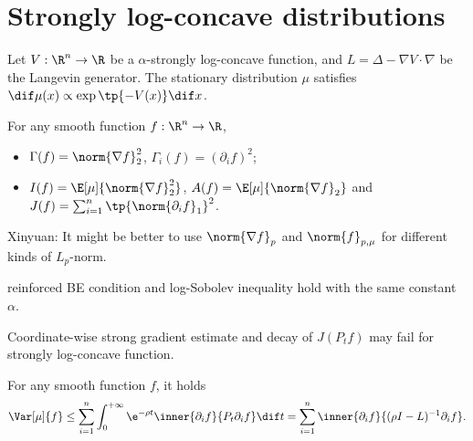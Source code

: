 \section{Strongly log-concave distributions}

Let $V:\R^n \to \R$ be a $\alpha$-strongly log-concave function, and $L = \Delta - \nabla V \cdot \nabla$ be the Langevin generator. The stationary distribution $\mu$ satisfies $\dif \mu(x) \propto \exp\tp{-V(x)} \dif x$.

\begin{definition}
    For any smooth function $f : \R^n \to \R$,
    \begin{itemize}
    \item $\Gamma(f) = \norm{\nabla f}_2^2$, $\Gamma_i(f) = (\partial_i f)^2$;
    \item $I(f) = \E[\mu]{\norm{\nabla f}_2^2}$, $A(f) = \E[\mu]{\norm{\nabla f}_2}$ and $J(f) = \sum_{i=1}^n \tp{\norm{\partial_i f}_1}^2$.
    \end{itemize}
\end{definition}

{\color{blue}
Xinyuan: It might be better to use $\norm{\nabla f}_p$ and $\norm{f}_{p,\mu}$ for different kinds of $L_p$-norm.
}


\begin{proposition}[folklore]
    reinforced BE condition and log-Sobolev inequality hold with the same constant $\alpha$.
\end{proposition}

\begin{remark}
    Coordinate-wise strong gradient estimate and decay of $J(P_t f)$ may fail for strongly log-concave function.
\end{remark}
\begin{lemma}\label{lem:variance-estimate}
    For any smooth function $f$, it holds
    \begin{align*}
        \Var[\mu]{f} \le \sum_{i=1}^n \int_0^{+\infty} \e^{-\rho t} \inner{\partial_i f}{P_t \partial_i f} \dif t = \sum_{i=1}^n \inner{\partial_i f}{(\rho I - L)^{-1} \partial_i f}.
    \end{align*}
\end{lemma}

